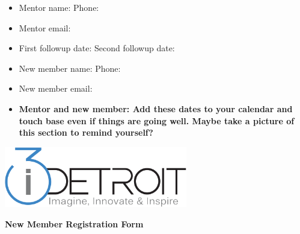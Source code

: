 \documentclass[10pt,letterpaper]{article}
\begin{document}
\noindent\makebox[\linewidth]{\rule{\paperwidth}{0.4pt}}

    \begin{Form}
        \begin{itemize}
            \item[] Mentor name: \TextField[name=mname,width=4cm,bordercolor=black]{\mbox{}} Phone: \TextField[name=mphone,width=2cm,bordercolor=black]{\mbox{}}
            \item[] Mentor email: \TextField[name=memail,width=6cm,bordercolor=black]{\mbox{}}
            \item[] First followup date: \TextField[name=fdate,width=2cm,bordercolor=black]{\mbox{}} Second followup date: \TextField[name=sdate,width=2cm,bordercolor=black]{\mbox{}}
            \item[] New member name: \TextField[name=nname,width=4cm,bordercolor=black]{\mbox{}} Phone: \TextField[name=nphone,width=2cm,bordercolor=black]{\mbox{}}
            \item[] New member email: \TextField[name=nemail,width=6cm,bordercolor=black]{\mbox{}}
            \item[] \textbf{Mentor and new member: Add these dates to your calendar and touch base even if things are going well. Maybe take a picture of this section to remind yourself?}
        \end{itemize}
     \end{Form}

\newpage

\includegraphics[width=80mm]{Logo.pdf}

\small

\centering \textbf{New Member Registration Form}

\raggedright
\end{document}

